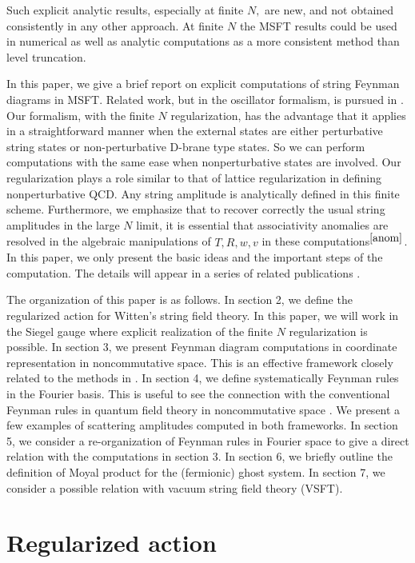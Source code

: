 \documentclass[a4paper,11pt]{article}
\begin{document}
Such explicit analytic results, especially at finite $N,$ are new, and not
obtained consistently in any other approach. At finite $N$ the MSFT results
could be used in numerical as well as analytic computations as a more
consistent method than level truncation.

In this paper, we give a brief report on explicit computations of string
Feynman diagrams in MSFT. Related work, but in the oscillator formalism, is
pursued in \cite{Taylor}. Our formalism, with the finite $N$ regularization,
has the advantage that it applies in a straightforward manner when the
external states are either perturbative string states or non-perturbative
D-brane type states. So we can perform computations with the same ease when
nonperturbative states are involved. Our regularization plays a role similar
to that of lattice regularization in defining nonperturbative QCD. Any
string amplitude is analytically defined in this finite scheme. Furthermore,
we emphasize that to recover correctly the usual string amplitudes in the
large $N$ limit, it is essential that associativity anomalies are resolved
in the algebraic manipulations of $T,R,w,v$ in these computations$^{\ref%
{anom}}$. In this paper, we only present the basic ideas and the important
steps of the computation. The details will appear in a series of related
publications \cite{PREP}.

The organization of this paper is as follows. In section 2, we define the
regularized action for Witten's string field theory. In this paper, we will
work in the Siegel gauge where explicit realization of the finite $N$
regularization is possible. In section 3, we present Feynman diagram
computations in coordinate representation in noncommutative space. This is
an effective framework closely related to the methods in \cite{BM2}. In
section 4, we define systematically Feynman rules in the Fourier basis. This
is useful to see the connection with the conventional Feynman rules in
quantum field theory in noncommutative space \cite{Noncomm}. We present a
few examples of scattering amplitudes computed in both frameworks. In
section 5, we consider a re-organization of Feynman rules in Fourier space
to give a direct relation with the computations in section 3. In section 6,
we briefly outline the definition of Moyal product for the (fermionic) ghost
system. In section 7, we consider a possible relation with vacuum string
field theory (VSFT).

\section{Regularized action}
\end{document}
